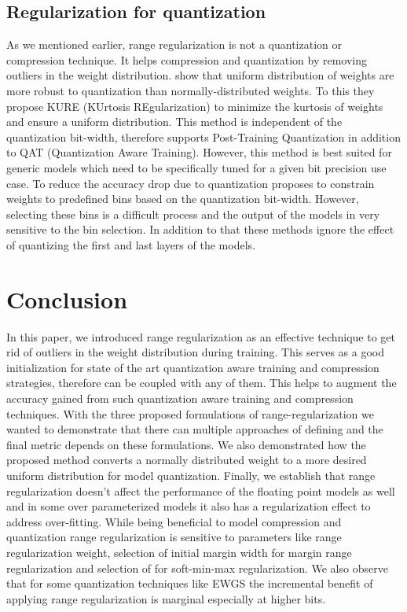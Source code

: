 \documentclass[10pt,twocolumn,letterpaper]{article}
\begin{document}
\subsection{Regularization for quantization}
As we mentioned earlier, range regularization is not a quantization or compression technique. It helps compression and quantization by removing outliers in the weight distribution. \cite{kure} show that uniform distribution of weights are more robust to quantization than normally-distributed weights. To this they propose KURE (KUrtosis REgularization) to minimize the kurtosis of weights and ensure a uniform distribution. This method is independent of the quantization bit-width, therefore supports Post-Training Quantization in addition to QAT (Quantization Aware Training). However, this method is best suited for generic models which need to be specifically tuned for a given bit precision use case. To reduce the accuracy drop due to quantization \cite{binregularization} proposes to constrain weights to predefined bins based on the quantization bit-width. However, selecting these bins is a difficult process and the output of the models in very sensitive to the bin selection. In addition to that these methods ignore the effect of quantizing the first and last layers of the models. \section{Conclusion}
In this paper, we introduced range regularization as an effective technique to get rid of outliers in the weight distribution during training. This serves as a good initialization for state of the art quantization aware training and compression strategies, therefore can be coupled with any of them. This helps to augment the accuracy gained from such quantization aware training and compression techniques. With the three proposed formulations of range-regularization we wanted to demonstrate that there can multiple approaches of defining  and the final metric depends on these formulations. We also demonstrated how the proposed method converts a normally distributed weight to a more desired uniform distribution for model quantization. Finally, we establish that range regularization doesn't affect the performance of the floating point models as well and in some over parameterized models it also has a regularization effect to address over-fitting. While being beneficial to model compression and quantization range regularization is sensitive to parameters like range regularization weight, selection of initial margin width for margin range regularization and selection of  for soft-min-max regularization. We also observe that for some quantization techniques like EWGS the incremental benefit of applying range regularization is marginal especially at higher bits. {\small


}
\end{document}
